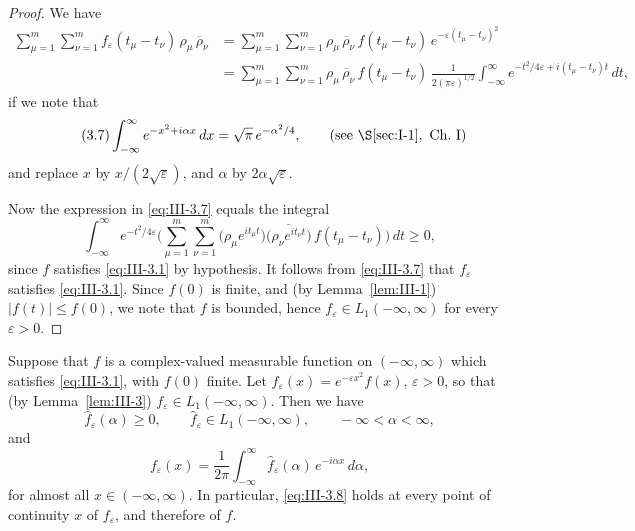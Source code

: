 \begin{proof}
We have
\begin{align*}
\sum_{\mu=1}^{m}\sum_{\nu=1}^{m}f_{\varepsilon}(t_{\mu}-t_{\nu})\,\rho_{\mu}\,\overline{\rho}_{\nu}
&=\sum_{\mu=1}^{m}\sum_{\nu=1}^{m}\rho_{\mu}\,\overline{\rho}_{\nu}\,f(t_{\mu}-t_{\nu})\,e^{-\varepsilon(t_{\mu}-t_{\nu})^{2}}\\
&=\sum_{\mu=1}^{m}\sum_{\nu=1}^{m}\rho_{\mu}\,\overline{\rho}_{\nu}\,f(t_{\mu}-t_{\nu})\,
\frac{1}{2(\pi\varepsilon)^{1/2}}\int_{-\infty}^{\infty}e^{-t^{2}/4\varepsilon+i(t_{\mu}-t_{\nu})t}\,dt,
\end{align*}
if we note that
\begin{equation}\tag{3.7}\label{eq:III-3.7}
\int_{-\infty}^{\infty}e^{-x^{2}+i\alpha x}\,dx=\sqrt{\pi}\,e^{-\alpha^{2}/4},\qquad(\text{see }\S\ref{sec:I-1},\text{ Ch.~I})
\end{equation}
and replace $x$ by $x/(2\sqrt{\varepsilon})$, and $\alpha$ by $2\alpha\sqrt{\varepsilon}$.

Now the expression in \eqref{eq:III-3.7} equals the integral
\[
\int_{-\infty}^{\infty}e^{-t^{2}/4\varepsilon}
\Biggl(\sum_{\mu=1}^{m}\sum_{\nu=1}^{m}
\bigl(\rho_{\mu}e^{it_{\mu}t}\bigr)\overline{\bigl(\rho_{\nu}e^{it_{\nu}t}\bigr)}\,f(t_{\mu}-t_{\nu})\Biggr)\,dt\ge0,
\]
since $f$ satisfies \eqref{eq:III-3.1} by hypothesis. It follows from \eqref{eq:III-3.7} that $f_{\varepsilon}$ satisfies \eqref{eq:III-3.1}. Since $f(0)$ is finite, and (by Lemma~\ref{lem:III-1}) $|f(t)|\le f(0)$, we note that $f$ is bounded, hence $f_{\varepsilon}\in L_{1}(-\infty,\infty)$ for every $\varepsilon>0$.
\end{proof}

\begin{lemma}\label{lem:III-4}
Suppose that $f$ is a complex-valued measurable function on $(-\infty,\infty)$ which satisfies \eqref{eq:III-3.1}, with $f(0)$ finite. Let $f_{\varepsilon}(x)=e^{-\varepsilon x^{2}}f(x)$, $\varepsilon>0$, so that (by Lemma~\ref{lem:III-3}) $f_{\varepsilon}\in L_{1}(-\infty,\infty)$. Then we have
\[
\hat f_{\varepsilon}(\alpha)\ge0,\qquad \hat f_{\varepsilon}\in L_{1}(-\infty,\infty),\qquad-\infty<\alpha<\infty,
\]
and
\begin{equation}\tag{3.8}\label{eq:III-3.8}
f_{\varepsilon}(x)=\frac{1}{2\pi}\int_{-\infty}^{\infty}\hat f_{\varepsilon}(\alpha)\,e^{-i\alpha x}\,d\alpha,
\end{equation}
for almost all $x\in(-\infty,\infty)$. In particular, \eqref{eq:III-3.8} holds at every point of continuity $x$ of $f_{\varepsilon}$, and therefore of $f$.
\end{lemma}

